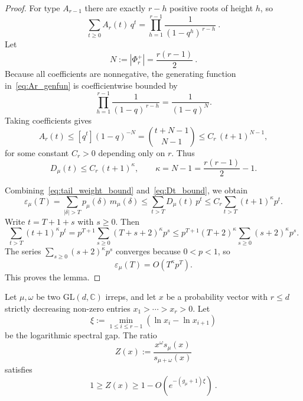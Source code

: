 \documentclass[a4paper,onecolumn,11pt]{quantumarticle}
\providecommand{\customgenericname}{}
\newenvironment{mlemma}[1]{%
  \renewcommand\customgenericname{Lemma}%
  \renewcommand\theinnercustomgeneric{#1}%
  \innercustomgeneric
}{\endinnercustomgeneric}
\begin{document}
\begin{proof}
For type \(A_{r-1}\) there are exactly \(r-h\) positive roots of height \(h\), so
\begin{equation}\label{eq:Ar_genfun}
    \sum_{t\ge 0} A_r(t)\,q^t
    =
    \prod_{h=1}^{r-1}\frac{1}{(1-q^h)^{\,r-h}}\ .
\end{equation}
Let
\begin{equation}
    N:= |\Phi_r^+|=\frac{r(r-1)}2\ .
\end{equation}
Because all coefficients are nonnegative, the generating function in~\eqref{eq:Ar_genfun} is coefficientwise bounded by
\[
    \prod_{h=1}^{r-1}\frac{1}{(1-q)^{\,r-h}}
    =
    \frac{1}{(1-q)^N}.
\]
Taking coefficients gives
\begin{equation}
    A_r(t)
    \le
    [q^t](1-q)^{-N}
    =
    \binom{t+N-1}{N-1}
    \le
    C_r\,(t+1)^{N-1},
\end{equation}
for some constant \(C_r>0\) depending only on \(r\). Thus
\begin{equation}\label{eq:Dt_bound}
    D_\mu(t)\le C_r\,(t+1)^\kappa,
    \qquad
    \kappa=N-1=\frac{r(r-1)}2-1.
\end{equation}

Combining~\eqref{eq:tail_weight_bound} and~\eqref{eq:Dt_bound}, we obtain
\begin{equation}
    \varepsilon_\mu(T)
    =
    \sum_{|\delta|>T} p_\mu(\delta)\,m_\mu(\delta)
    \le
    \sum_{t>T} D_\mu(t)\,p^t 
    \le
    C_r \sum_{t>T} (t+1)^\kappa p^t.
\end{equation}
Write \(t=T+1+s\) with \(s\ge 0\). Then
\[
    \sum_{t>T}(t+1)^\kappa p^t
    =
    p^{T+1}\sum_{s\ge 0}(T+s+2)^\kappa p^s
    \le
    p^{T+1}(T+2)^\kappa \sum_{s\ge 0}(s+2)^\kappa p^s.
\]
The series \(\sum_{s\ge 0}(s+2)^\kappa p^s\) converges because \(0<p<1\), so
\begin{equation}
    \varepsilon_\mu(T)=O\!\left(T^\kappa p^T\right).
\end{equation}
This proves the lemma.
\end{proof}





\begin{mlemma}{9}[Probability Ratio]
    Let \(\mu,\omega\) be two \(\mathrm{GL}(d,\mathbb C)\) irreps, and let \(x\) be a probability vector with \(r \le d\) strictly decreasing non-zero entries \(x_1>\cdots>x_r>0\). Let
    \[
    \xi := \min_{1 \le i \le r-1} (\ln x_i - \ln x_{i+1})
    \]
    be the logarithmic spectral gap. The ratio
    \begin{equation}
    Z(x):= \frac{x^\omega s_\mu(x)}{s_{\mu+\omega}(x)}
    \end{equation}
    satisfies
    \[
        1 \ge Z(x) \ge 1 - O\left(e^{-(g_\mu+1)\xi}\right)\ .
    \]
\end{mlemma} 
\end{document}
